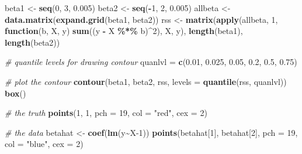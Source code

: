 \documentclass[
]{book}
\newenvironment{Shaded}{\begin{snugshade}}{\end{snugshade}}
\newcommand{\AttributeTok}[1]{\textcolor[rgb]{0.13,0.29,0.53}{#1}}
\newcommand{\CommentTok}[1]{\textcolor[rgb]{0.56,0.35,0.01}{\textit{#1}}}
\newcommand{\ControlFlowTok}[1]{\textcolor[rgb]{0.13,0.29,0.53}{\textbf{#1}}}
\newcommand{\DecValTok}[1]{\textcolor[rgb]{0.00,0.00,0.81}{#1}}
\newcommand{\FloatTok}[1]{\textcolor[rgb]{0.00,0.00,0.81}{#1}}
\newcommand{\FunctionTok}[1]{\textcolor[rgb]{0.13,0.29,0.53}{\textbf{#1}}}
\newcommand{\NormalTok}[1]{#1}
\newcommand{\OtherTok}[1]{\textcolor[rgb]{0.56,0.35,0.01}{#1}}
\newcommand{\SpecialCharTok}[1]{\textcolor[rgb]{0.81,0.36,0.00}{\textbf{#1}}}
\newcommand{\StringTok}[1]{\textcolor[rgb]{0.31,0.60,0.02}{#1}}
\theoremstyle{definition}
\theoremstyle{definition}
\theoremstyle{definition}
\theoremstyle{definition}
\theoremstyle{remark}
\begin{document}
\begin{Shaded}
\begin{Highlighting}[]
\NormalTok{  beta1 }\OtherTok{\textless{}{-}} \FunctionTok{seq}\NormalTok{(}\DecValTok{0}\NormalTok{, }\DecValTok{3}\NormalTok{, }\FloatTok{0.005}\NormalTok{)}
\NormalTok{  beta2 }\OtherTok{\textless{}{-}} \FunctionTok{seq}\NormalTok{(}\SpecialCharTok{{-}}\DecValTok{1}\NormalTok{, }\DecValTok{2}\NormalTok{, }\FloatTok{0.005}\NormalTok{)}
\NormalTok{  allbeta }\OtherTok{\textless{}{-}} \FunctionTok{data.matrix}\NormalTok{(}\FunctionTok{expand.grid}\NormalTok{(beta1, beta2))}
\NormalTok{  rss }\OtherTok{\textless{}{-}} \FunctionTok{matrix}\NormalTok{(}\FunctionTok{apply}\NormalTok{(allbeta, }\DecValTok{1}\NormalTok{, }\ControlFlowTok{function}\NormalTok{(b, X, y) }\FunctionTok{sum}\NormalTok{((y }\SpecialCharTok{{-}}\NormalTok{ X }\SpecialCharTok{\%*\%}\NormalTok{ b)}\SpecialCharTok{\^{}}\DecValTok{2}\NormalTok{), X, y), }
                \FunctionTok{length}\NormalTok{(beta1), }\FunctionTok{length}\NormalTok{(beta2))}
  
  \CommentTok{\# quantile levels for drawing contour}
\NormalTok{  quanlvl }\OtherTok{=} \FunctionTok{c}\NormalTok{(}\FloatTok{0.01}\NormalTok{, }\FloatTok{0.025}\NormalTok{, }\FloatTok{0.05}\NormalTok{, }\FloatTok{0.2}\NormalTok{, }\FloatTok{0.5}\NormalTok{, }\FloatTok{0.75}\NormalTok{)}
  
  \CommentTok{\# plot the contour}
  \FunctionTok{contour}\NormalTok{(beta1, beta2, rss, }\AttributeTok{levels =} \FunctionTok{quantile}\NormalTok{(rss, quanlvl))}
  \FunctionTok{box}\NormalTok{()}
  
  \CommentTok{\# the truth}
  \FunctionTok{points}\NormalTok{(}\DecValTok{1}\NormalTok{, }\DecValTok{1}\NormalTok{, }\AttributeTok{pch =} \DecValTok{19}\NormalTok{, }\AttributeTok{col =} \StringTok{"red"}\NormalTok{, }\AttributeTok{cex =} \DecValTok{2}\NormalTok{)}
  
  \CommentTok{\# the data }
\NormalTok{  betahat }\OtherTok{\textless{}{-}} \FunctionTok{coef}\NormalTok{(}\FunctionTok{lm}\NormalTok{(y}\SpecialCharTok{\textasciitilde{}}\NormalTok{X}\DecValTok{{-}1}\NormalTok{))}
  \FunctionTok{points}\NormalTok{(betahat[}\DecValTok{1}\NormalTok{], betahat[}\DecValTok{2}\NormalTok{], }\AttributeTok{pch =} \DecValTok{19}\NormalTok{, }\AttributeTok{col =} \StringTok{"blue"}\NormalTok{, }\AttributeTok{cex =} \DecValTok{2}\NormalTok{)}
\end{Highlighting}
\end{Shaded}
\end{document}
